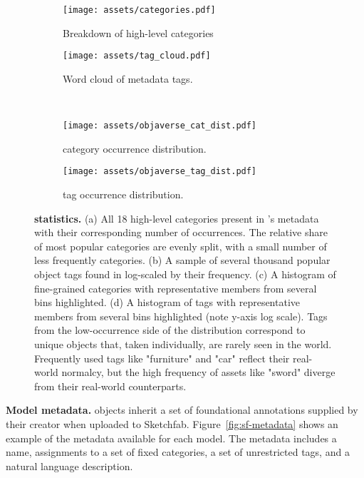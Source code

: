 \begin{figure*}[t!]
     \centering
          \begin{subfigure}[b]{0.48\textwidth}
         \centering
         \texttt{[image: assets/categories.pdf]}
         \caption{Breakdown of high-level \data categories}
         \label{figures:category_donut} 
     \end{subfigure}
     \hfill
     \begin{subfigure}[b]{0.48\textwidth}
         \centering
         \texttt{[image: assets/tag\_cloud.pdf]}
         \caption{Word cloud of \data metadata tags.}
         \label{figures:tag_cloud} 
     \end{subfigure}
     \\[0.15in]
     \begin{subfigure}[b]{0.48\textwidth}
         \centering
         \texttt{[image: assets/objaverse\_cat\_dist.pdf]}
         \caption{\datalvis category occurrence distribution.}
         \label{figures:lvis_cat_dist} 
     \end{subfigure}
     \hfill
     \begin{subfigure}[b]{0.495\textwidth}
         \centering
         \texttt{[image: assets/objaverse\_tag\_dist.pdf]}
         \caption{\data tag occurrence distribution.}
         \label{figures:tag_dist} 
     \end{subfigure}
     \caption{\textbf{\data statistics.} (a) All 18 high-level categories present in \data's metadata with their corresponding number of occurrences. The relative share of most popular categories are evenly split, with a small number of less frequently categories. (b) A sample of several thousand popular object tags found in \data log-scaled by their frequency. (c) A histogram of fine-grained \datalvis categories with representative members from several bins highlighted.
     (d) A histogram of \data tags with representative members from several bins highlighted (note y-axis log scale). Tags from the low-occurrence side of the distribution correspond to unique objects that, taken individually, are rarely seen in the world. Frequently used tags like "furniture" and "car" reflect their real-world normalcy, but the high frequency of assets like "sword" diverge from their real-world counterparts.} 
     \label{fig:metadata vis}
     \vspace{-1em}
\end{figure*}

\textbf{Model metadata.}
\data objects inherit a set of foundational annotations supplied by their creator when uploaded to Sketchfab. Figure~\ref{fig:sf-metadata} shows an example of the metadata available for each model. The metadata includes a name, assignments to a set of fixed categories, a set of unrestricted tags, and a natural language description.

